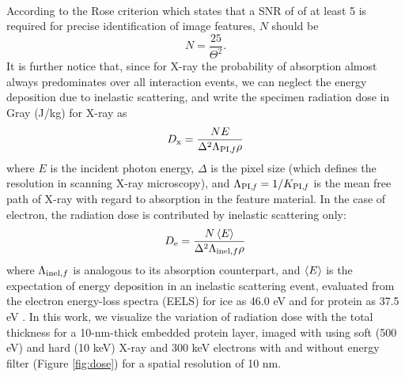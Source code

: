 \documentclass[review]{elsarticle}
\newcommand\inel{\textup{\scriptsize{inel}}}
\newcommand\PIf{\textup{\scriptsize{PI,\textit f}}}
\begin{document}
\paragraph{} According to the Rose criterion which states that a SNR of of at least 5 is required for precise identification of image features, $N$ should be
\begin{equation}
N = \frac{25}{\Theta^2}.
\end{equation}
It is further notice that, since for X-ray the probability of absorption almost always predominates over all interaction events, we can neglect the energy deposition due to inelastic scattering, and write the specimen radiation dose in Gray (J/kg) for X-ray as 
\begin{equation}
D_\mathrm{x} = \frac{NE}{\Delta^2 \Lambda_{\PIf} \rho}
\end{equation}
where $E$ is the incident photon energy, $\Delta$ is the pixel size (which defines the resolution in scanning X-ray microscopy), and $\Lambda_{\PIf} = 1/K_{\PIf}$ is the mean free path of X-ray with regard to absorption in the feature material. In the case of electron, the radiation dose is contributed by inelastic scattering only:
\begin{equation}
D_\mathrm{e} = \frac{N\Braket{E}}{\Delta^2 \Lambda_{\inel,f} \rho}
\end{equation}
where $\Lambda_{\inel,f}$ is analogous to its absorption counterpart, and $\Braket{E}$ is the expectation of energy deposition in an inelastic scattering event, evaluated from the electron energy-loss spectra (EELS) for ice as 46.0 eV and for protein as 37.5 eV \cite{Isaacson:1975wr}. In this work, we visualize the variation of radiation dose with the total thickness for a 10-nm-thick embedded protein layer, imaged with using soft (500 eV) and hard (10 keV) X-ray and 300 keV electrons with and without energy filter (Figure \ref{fig:dose}) for a spatial resolution of 10 nm. 
\end{document}
